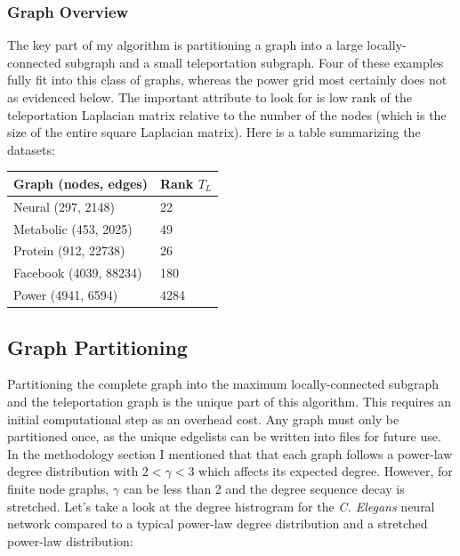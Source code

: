 \documentclass{article}
\begin{document}
\subsubsection{Graph Overview}
The key part of my algorithm is partitioning a graph into a large locally-connected subgraph and a small teleportation subgraph. Four of these examples fully fit into this class of graphs, whereas the power grid most certainly does not as evidenced below. The important attribute to look for is low rank of the teleportation Laplacian matrix relative to the number of the nodes (which is the size of the entire square Laplacian matrix). Here is a table summarizing the datasets:


\begin{center}
\renewcommand{\arraystretch}{1.5}
    \begin{tabular}{| l | l |}
    \hline
    Graph (nodes, edges) & Rank $T_L$ \\ \hline
    Neural (297, 2148) & 22 \\ \hline
    Metabolic (453, 2025) & 49\\  \hline
    Protein (912, 22738) & 26 \\ \hline
    Facebook (4039, 88234) &  180 \\ \hline
    Power (4941, 6594) & 4284 \\ 
    \hline
    \end{tabular}
\end{center}

\subsection{Graph Partitioning}
Partitioning the complete graph into the maximum locally-connected subgraph and the teleportation graph is the unique part of this algorithm. This requires an initial computational step as an overhead cost. Any graph must only be partitioned once, as the unique edgelists can be written into files for future use. In the methodology section I mentioned that that each graph follows a power-law degree distribution with $2 < \gamma < 3$ which affects its expected degree. However, for finite node graphs, $\gamma$ can be less than 2 and the degree sequence decay is stretched. Let's take a look at the degree histrogram for the \textit{C. Elegans} neural network compared to a typical power-law degree distribution and a stretched power-law distribution:
\end{document}
